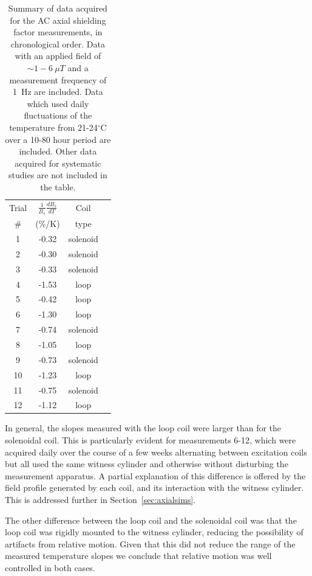 \begin{table}
\begin{center}
\begin{tabular}{cccc}\hline
Trial & $\frac{1}{B_s}\frac{dB_s}{dT}$ & Coil \\
\#    & (\%/K) & type \\\hline
 1 & -0.32 & solenoid \\
 2 & -0.30 & solenoid \\
 3 & -0.33 & solenoid \\
 4 & -1.53 & loop \\
 5 & -0.42 & loop \\
 6 & -1.30 & loop \\
 7 & -0.74 & solenoid \\
 8 & -1.05 & loop \\
 9 & -0.73 & solenoid \\
10 & -1.23 & loop \\
11 & -0.75 & solenoid \\
12 & -1.12 & loop \\\hline
\end{tabular}
\caption[Summary of the AC axial shielding factor
measurements]{Summary of data acquired for the AC axial shielding
  factor measurements, in chronological order.  Data with an applied
  field of $\sim 1-6~\mu T$ and a measurement frequency of 1~Hz are
  included.  Data which used daily fluctuations of the temperature
  from 21-24$^\circ$C over a 10-80 hour period are included.  Other
  data acquired for systematic studies are not included in the
  table.\label{tab:axial}}
\end{center}
\end{table}

In general, the slopes measured with the loop coil were larger than
for the solenoidal coil.  This is particularly evident for
measurements 6-12, which were acquired daily over the course of a few
weeks alternating between excitation coils but all used the same
witness cylinder and otherwise without disturbing the measurement
apparatus.  A partial explanation of this difference is offered by the
field profile generated by each coil, and its interaction with the
witness cylinder.  This is addressed further in
Section~\ref{sec:axialsims}.

The other difference between the loop coil and the solenoidal coil was
that the loop coil was rigidly mounted to the witness cylinder,
reducing the possibility of artifacts from relative motion.  Given
that this did not reduce the range of the measured temperature slopes
we conclude that relative motion was well controlled in both cases.

